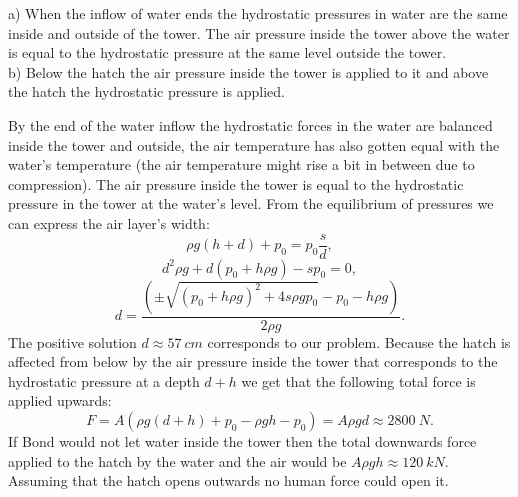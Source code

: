 \hinteng
a) When the inflow of water ends the hydrostatic pressures in water are the same inside and outside of the tower. The air pressure inside the tower above the water is equal to the hydrostatic pressure at the same level outside the tower.\\
b) Below the hatch the air pressure inside the tower is applied to it and above the hatch the hydrostatic pressure is applied.

\solueng
By the end of the water inflow the hydrostatic forces in the water are balanced inside the tower and outside, the air temperature has also gotten equal with the water’s temperature (the air temperature might rise a bit in between due to compression). The air pressure inside the tower is equal to the hydrostatic pressure in the tower at the water’s level. From the equilibrium of pressures we can express the air layer’s width:
$$ \rho g (h+d) + p_0 = p_0 \frac{s}{d},$$
$$ d^2 \rho g  + d (p_0 + h \rho g) - s p_0=0, $$
$$ d = \frac{( \pm \sqrt{(p_0 + h \rho g)^2 + 4 s \rho g p_0 } - p_0 - h \rho g)}{2\rho g }.$$
The positive solution $d \approx \SI{57}{cm}$ corresponds to our problem. Because the hatch is affected from below by the air pressure inside the tower that corresponds to the hydrostatic pressure at a depth $d+h$ we get that the following total force is applied upwards:
$$F = A(\rho g (d+h) + p_0 - \rho g h - p_0) = A \rho g d \approx \SI{2800}{N}.  $$
If Bond would not let water inside the tower then the total downwards force applied to the hatch by the water and the air would be $A \rho g h \approx \SI{120}{kN}$. Assuming that the hatch opens outwards no human force could open it.
\probend